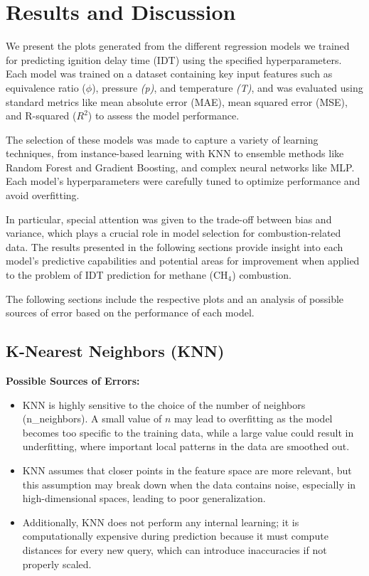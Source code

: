 \documentclass[12pt]{report}
\begin{document}

\chapter{Results and Discussion}
We present the plots generated from the different regression models we trained for predicting ignition delay time (IDT) using the specified hyperparameters. Each model was trained on a dataset containing key input features such as equivalence ratio (\(\phi\)), pressure \textit{(p)}, and temperature \textit{(T)}, and was evaluated using standard metrics like mean absolute error (MAE), mean squared error (MSE), and R-squared (\(R^2\)) to assess the model performance.

The selection of these models was made to capture a variety of learning techniques, from instance-based learning with KNN to ensemble methods like Random Forest and Gradient Boosting, and complex neural networks like MLP. Each model’s hyperparameters were carefully tuned to optimize performance and avoid overfitting.

In particular, special attention was given to the trade-off between bias and variance, which plays a crucial role in model selection for combustion-related data. The results presented in the following sections provide insight into each model’s predictive capabilities and potential areas for improvement when applied to the problem of IDT prediction for methane (CH\(_4\)) combustion.

The following sections include the respective plots and an analysis of possible sources of error based on the performance of each model.




\section{K-Nearest Neighbors (KNN)}


\textbf{Possible Sources of Errors:} 
\begin{itemize}
    \item KNN is highly sensitive to the choice of the number of neighbors (n\_neighbors). A small value of \(n\) may lead to overfitting as the model becomes too specific to the training data, while a large value could result in underfitting, where important local patterns in the data are smoothed out.
    \item KNN assumes that closer points in the feature space are more relevant, but this assumption may break down when the data contains noise, especially in high-dimensional spaces, leading to poor generalization.
    \item Additionally, KNN does not perform any internal learning; it is computationally expensive during prediction because it must compute distances for every new query, which can introduce inaccuracies if not properly scaled.
\end{itemize}
\end{document}
